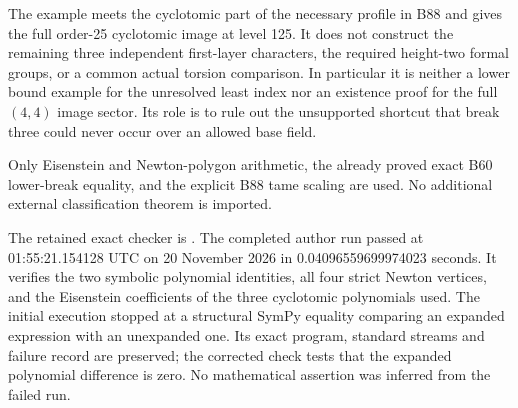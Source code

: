 \begin{remark}
\label{rem:B-RD89-scope}
The example meets the cyclotomic part of the necessary
profile in B88 and gives the full order-25 cyclotomic
image at level 125. It does not construct the remaining
three independent first-layer characters, the required
height-two formal groups, or a common actual torsion
comparison. In particular it is neither a lower bound
example for the unresolved least index nor an existence
proof for the full \((4,4)\) image sector. Its role is
to rule out the unsupported shortcut that break three
could never occur over an allowed base field.

Only Eisenstein and Newton-polygon arithmetic, the
already proved exact B60 lower-break equality, and
the explicit B88 tame scaling are used. No additional
external classification theorem is imported.

The retained exact checker is
.
The completed author run passed at 01:55:21.154128 UTC
on 20 November 2026 in 0.04096559699974023 seconds.
It verifies the two symbolic polynomial identities,
all four strict Newton vertices, and the Eisenstein
coefficients of the three cyclotomic polynomials used.
The initial execution stopped at a structural SymPy
equality comparing an expanded expression with an
unexpanded one. Its exact program, standard streams
and failure record are preserved; the corrected check
tests that the expanded polynomial difference is zero.
No mathematical assertion was inferred from the failed run.
\end{remark}
